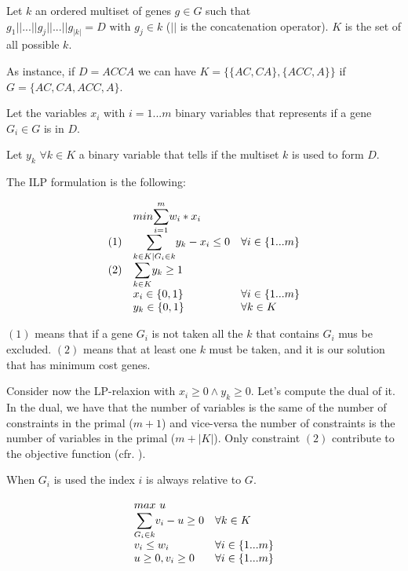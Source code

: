 \documentclass[paper=a4, fontsize=11pt]{scrartcl} %
\numberwithin{equation}{section} %
\numberwithin{figure}{section} %
\numberwithin{table}{section} %
\begin{document}
Let $k$ an ordered multiset of genes $g \in G$ such that $g_1 || ... || g_j || ... || g_{|k|} = D \text{ with } g_j \in k$ ($||$ is the concatenation operator). $K$ is the set of all possible $k$.

As instance, if $D = ACCA$ we can have $K = \{\{AC,CA\},\{ACC,A\}\}$ if $G = \{AC,CA,ACC,A\}$.

Let the variables $x_i$ with $i = 1 ... m$ binary variables that represents if a gene $G_i \in G$ is in $D$. 

Let $y_k$ $\forall k \in K$ a binary variable that tells if the multiset $k$ is used to form $D$.

The ILP formulation is the following:

\[
    \begin{array}{lll}
    & min \mathlarger{\sum}_{i = 1}^m w_i*x_i & \\
    (1) & \mathlarger{\sum}_{k \in K | G_i \in k} y_k - x_i \leq 0 & \forall i \in \{1 ... m\} \\
    (2) & \mathlarger{\sum}_{k \in K} y_k \geq 1 & \\
    & x_i \in \{0, 1\} & \forall i \in \{1 ... m\} \\
    & y_k \in \{0, 1\} & \forall k \in K
    \end{array}
\]

$(1)$ means that if a gene $G_i$ is not taken all the $k$ that contains $G_i$ mus be excluded. $(2)$ means that at least one $k$ must be taken, and it is our solution that has minimum cost genes.

Consider now the LP-relaxion with $x_i \geq 0 \land y_k \geq 0$. Let's compute the dual of it.
In the dual, we have that the number of variables is the same of the number of constraints in the primal ($m+1$) and vice-versa the number of constraints is the number of variables in the primal ($m+|K|$).
Only constraint $(2)$ contribute to the objective function (cfr. \cite{cap8roma}).

When $G_i$ is used the index $i$ is always relative to $G$.

\[
    \begin{array}{ll}
    max\text{ }u & \\
    \mathlarger{\sum}_{G_i \in k} v_i - u \geq 0 & \forall k \in K \\
    v_i \leq w_i & \forall i \in \{1 ... m\}\\
    u \geq 0, v_i \geq 0 & \forall i \in \{1 ... m\}
    \end{array}
\]
\end{document}

